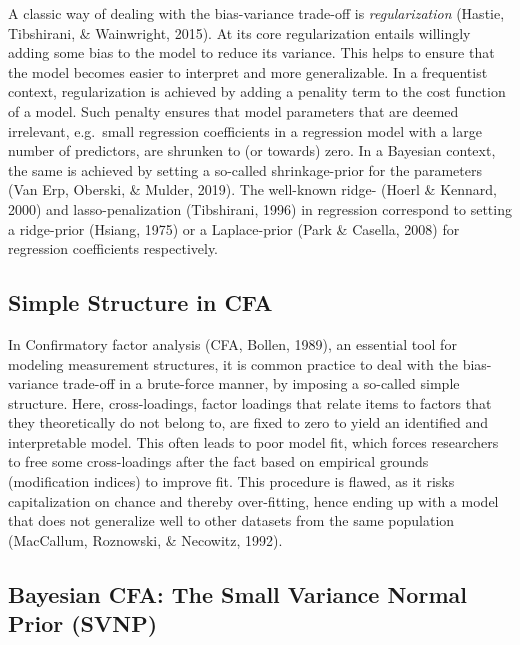 \documentclass[
  man,floatsintext]{apa6}
\begin{document}
A classic way of dealing with the bias-variance trade-off is \emph{regularization} (Hastie, Tibshirani, \& Wainwright, 2015). At its core regularization entails willingly adding some bias to the model to reduce its variance. This helps to ensure that the model becomes easier to interpret and more generalizable. In a frequentist context, regularization is achieved by adding a penality term to the cost function of a model. Such penalty ensures that model parameters that are deemed irrelevant, e.g.~small regression coefficients in a regression model with a large number of predictors, are shrunken to (or towards) zero. In a Bayesian context, the same is achieved by setting a so-called shrinkage-prior for the parameters (Van Erp, Oberski, \& Mulder, 2019). The well-known ridge- (Hoerl \& Kennard, 2000) and lasso-penalization (Tibshirani, 1996) in regression correspond to setting a ridge-prior (Hsiang, 1975) or a Laplace-prior (Park \& Casella, 2008) for regression coefficients respectively.

\hypertarget{simple-structure-in-cfa}{%
\subsection{Simple Structure in CFA}\label{simple-structure-in-cfa}}

In Confirmatory factor analysis (CFA, Bollen, 1989), an essential tool for modeling measurement structures, it is common practice to deal with the bias-variance trade-off in a brute-force manner, by imposing a so-called simple structure. Here, cross-loadings, factor loadings that relate items to factors that they theoretically do not belong to, are fixed to zero to yield an identified and interpretable model. This often leads to poor model fit, which forces researchers to free some cross-loadings after the fact based on empirical grounds (modification indices) to improve fit. This procedure is flawed, as it risks capitalization on chance and thereby over-fitting, hence ending up with a model that does not generalize well to other datasets from the same population (MacCallum, Roznowski, \& Necowitz, 1992).

\hypertarget{bayesian-cfa-the-small-variance-normal-prior-svnp}{%
\subsection{Bayesian CFA: The Small Variance Normal Prior (SVNP)}\label{bayesian-cfa-the-small-variance-normal-prior-svnp}}
\end{document}
